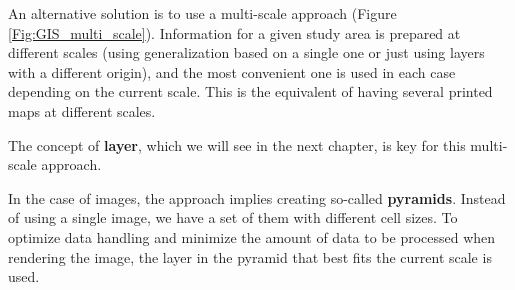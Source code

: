 An alternative solution is to use a multi-scale approach (Figure \ref{Fig:GIS_multi_scale}). Information for a given study area is prepared at different scales (using generalization based on a single one or just using layers with a different origin), and the most convenient one is used in each case depending on the current scale. This is the equivalent of having several printed maps at different scales.

The concept of \textbf{layer}, which we will see in the next chapter, is key for this multi-scale approach.

In the case of images, the approach implies creating so-called \textbf{pyramids}. Instead of using a single image, we have a set of them with different cell sizes. To optimize data handling and minimize the amount of data to be processed when rendering the image, the layer in the pyramid that best fits the current scale is used.

\pagestyle{empty}
